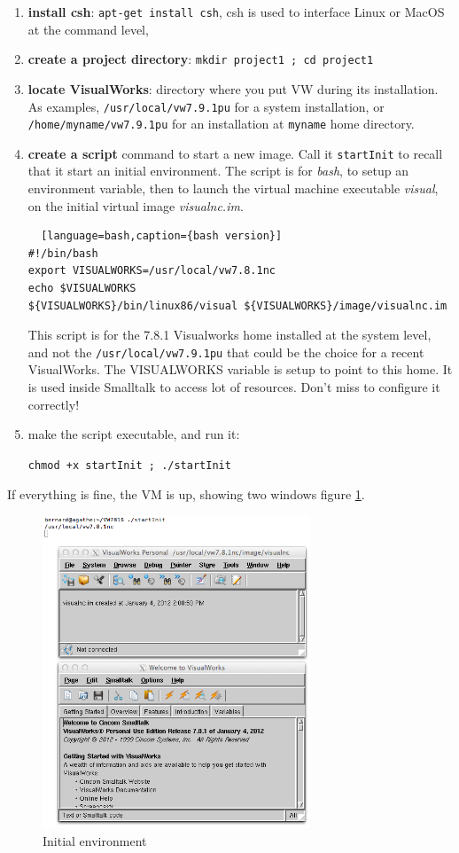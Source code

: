 \documentclass[times,a4paper]{book}
\begin{document}
\begin{enumerate}
\item {\bf install csh}: {\tt apt-get install csh}, csh is used to interface Linux or MacOS at the command level,
\item {\bf create a project directory}: {\tt mkdir project1 ; cd project1}
\item {\bf locate VisualWorks}: directory where  you put VW during its installation.
As examples, {\tt /usr/local/vw7.9.1pu} for a system installation, or {\tt /home/myname/vw7.9.1pu}
for an installation at {\tt myname} home directory.
\item {\bf create a script} command to start a new image. Call it {\tt startInit} to recall
that it start an initial environment.  The script is for {\sl bash}, to setup an environment variable,
then to launch the virtual machine executable {\sl visual}, on the initial virtual image {\sl visualnc.im}.

\begin{lstlisting}  [language=bash,caption={bash version}]
#!/bin/bash
export VISUALWORKS=/usr/local/vw7.8.1nc
echo $VISUALWORKS
${VISUALWORKS}/bin/linux86/visual ${VISUALWORKS}/image/visualnc.im
\end{lstlisting}


This script is for the 7.8.1 Visualworks home  installed at the system level,
and not the {\tt /usr/local/vw7.9.1pu} that could be the choice for a recent VisualWorks.
The VISUALWORKS variable is setup to point to this home. It is used inside
Smalltalk to access lot of resources. Don't miss to configure it correctly!

\item make the script executable, and run it:

{\tt chmod +x startInit ; ./startInit}
\end{enumerate}

If everything is fine, the VM is up, showing two windows figure \ref{fig:startInit-initialEnv}.


\begin{figure}[hbtp]
\begin{center} 
\includegraphics[width=8cm]{startInit-initialEnv.png}
\caption{Initial environment}
\label{fig:startInit-initialEnv}
\end{center}
\end{figure}
 
\end{document}
